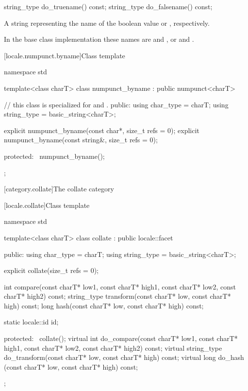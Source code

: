 %
%
\begin{itemdecl}
string_type do_truename()  const;
string_type do_falsename() const;
\end{itemdecl}

\begin{itemdescr}
\pnum
\returns
A string representing the name of the boolean value
or
,
respectively.

\pnum
In the base class implementation these names are
 and , or  and .
\end{itemdescr}

[locale.numpunct.byname]{Class template }

%
\begin{codeblock}
namespace std {
  template<class charT>
    class numpunct_byname : public numpunct<charT> {
    // this class is specialized for  and .
    public:
      using char_type   = charT;
      using string_type = basic_string<charT>;

      explicit numpunct_byname(const char*, size_t refs = 0);
      explicit numpunct_byname(const string&, size_t refs = 0);

    protected:
      ~numpunct_byname();
    };
}
\end{codeblock}

[category.collate]{The collate category}

[locale.collate]{Class template }

%
\begin{codeblock}
namespace std {
  template<class charT>
    class collate : public locale::facet {
    public:
      using char_type   = charT;
      using string_type = basic_string<charT>;

      explicit collate(size_t refs = 0);

      int compare(const charT* low1, const charT* high1,
                  const charT* low2, const charT* high2) const;
      string_type transform(const charT* low, const charT* high) const;
      long hash(const charT* low, const charT* high) const;

      static locale::id id;

    protected:
      ~collate();
      virtual int do_compare(const charT* low1, const charT* high1,
                             const charT* low2, const charT* high2) const;
      virtual string_type do_transform(const charT* low, const charT* high) const;
      virtual long do_hash (const charT* low, const charT* high) const;
    };
}
\end{codeblock}

